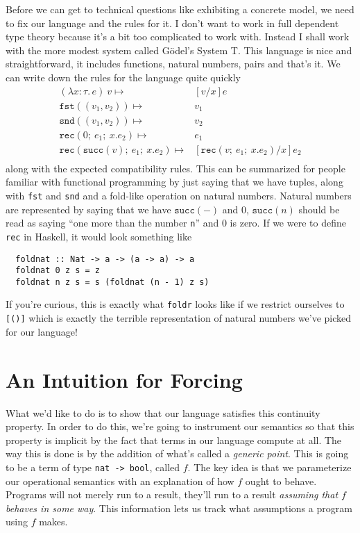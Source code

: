 \documentclass[12pt]{amsart}
\newcommand{\lam}[3]{\lambda #1 : #2.\, #3}
\newcommand{\ap}[2]{#1\ #2}
\newcommand{\prl}[1]{\mathtt{fst}(#1)}
\newcommand{\prr}[1]{\mathtt{snd}(#1)}
\newcommand{\natrec}[3]{\mathtt{rec}(#1;\ #2;\ #3)}
\renewcommand{\succ}[1]{\mathtt{succ}(#1)}
\begin{document}
Before we can get to technical questions like exhibiting a concrete
model, we need to fix our language and the rules for it. I don't want
to work in full dependent type theory because it's a bit too
complicated to work with. Instead I shall work with the more modest
system called G\"odel's System T. This language is nice and
straightforward, it includes functions, natural numbers, pairs and that's
it. We can write down the rules for the language quite quickly
\begin{align*}
  \ap{(\lam{x}{\tau}{e})}{v} \mapsto& [v/x]e\\
  \prl{(v_1, v_2)} \mapsto& v_1\\
  \prr{(v_1, v_2)} \mapsto& v_2\\
  \natrec{0}{e_1}{x.e_2} \mapsto& e_1\\
  \natrec{\succ{v}}{e_1}{x.e_2} \mapsto& [\natrec{v}{e_1}{x.e_2}/x]e_2\\
\end{align*}
along with the expected compatibility rules. This can be summarized
for people familiar with functional programming by just saying that we
have tuples, along with {\tt fst} and {\tt snd} and a fold-like
operation on natural numbers. Natural numbers are represented by
saying that we have $\succ{-}$ and $0$, $\succ{n}$ should be read as saying
``one more than the number {\tt n}'' and 0 is zero. If we were to
define {\tt rec} in Haskell, it would look something like
\begin{verbatim}
  foldnat :: Nat -> a -> (a -> a) -> a
  foldnat 0 z s = z
  foldnat n z s = s (foldnat (n - 1) z s)
\end{verbatim}
If you're curious, this is exactly what {\tt foldr} looks like if we
restrict ourselves to {\tt [()]} which is exactly the terrible
representation of natural numbers we've picked for our language!

\section{An Intuition for Forcing}

What we'd like to do is to show that our language satisfies this
continuity property. In order to do this, we're going to instrument
our semantics so that this property is implicit by the fact that terms
in our language compute at all. The way this is done is by the
addition of what's called a \emph{generic point}. This is going to be
a term of type {\tt nat -> bool}, called $f$. The key idea is that we
parameterize our operational semantics with an explanation of how $f$
ought to behave. Programs will not merely run to a result, they'll run
to a result \emph{assuming that $f$ behaves in some way}. This
information lets us track what assumptions a program using $f$ makes.
\end{document}
